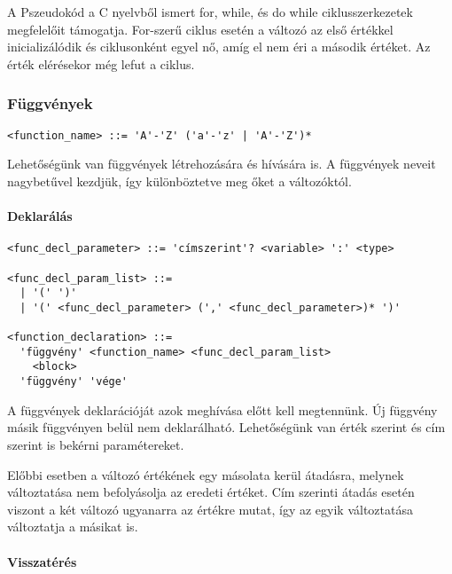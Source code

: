 A Pszeudokód a C nyelvből ismert for, while, és do while ciklusszerkezetek megfelelőit támogatja. For-szerű ciklus esetén a változó az első értékkel inicializálódik és ciklusonként egyel nő, amíg el nem éri a második értéket. Az érték elérésekor még lefut a ciklus.

\subsubsection{Függvények}

\begin{footnotesize}
\begin{verbatim}
<function_name> ::= 'A'-'Z' ('a'-'z' | 'A'-'Z')*
\end{verbatim}
\end{footnotesize}

Lehetőségünk van függvények létrehozására és hívására is. A függvények neveit nagybetűvel kezdjük, így különböztetve meg őket a változóktól.

\paragraph{Deklarálás}

\begin{footnotesize}
\begin{verbatim}
<func_decl_parameter> ::= 'címszerint'? <variable> ':' <type>

<func_decl_param_list> ::= 
  | '(' ')' 
  | '(' <func_decl_parameter> (',' <func_decl_parameter>)* ')'

<function_declaration> ::= 
  'függvény' <function_name> <func_decl_param_list> 
    <block> 
  'függvény' 'vége'
\end{verbatim}
\end{footnotesize}

A függvények deklarációját azok meghívása előtt kell megtennünk. Új függvény másik függvényen belül nem deklarálható. Lehetőségünk van érték szerint és cím szerint is bekérni paramétereket.

Előbbi esetben a változó értékének egy másolata kerül átadásra, melynek változtatása nem befolyásolja az eredeti értéket. Cím szerinti átadás esetén viszont a két változó ugyanarra az értékre mutat, így az egyik változtatása változtatja a másikat is.

\paragraph{Visszatérés}

